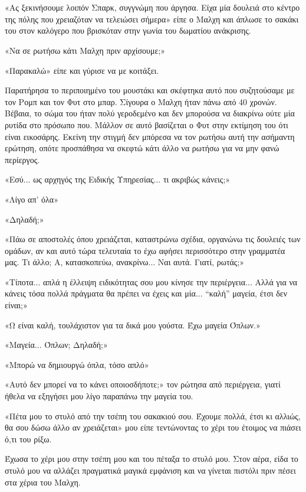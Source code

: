 \documentclass[12pt,twoside, openany]{book}
\begin{document}
\chapter{}

«Ας ξεκινήσουμε λοιπόν Σπαρκ, συγγνώμη που άργησα. Είχα μία δουλειά στο κέντρο της πόλης που χρειαζόταν να τελειώσει σήμερα» είπε ο Μαλχη και άπλωσε το σακάκι του στον καλόγερο που βρισκόταν στην γωνία του δωματίου ανάκρισης.

«Να σε ρωτήσω κάτι Μαλχη πριν αρχίσουμε;»

«Παρακαλώ» είπε και γύρισε να με κοιτάξει. 

Παρατήρησα το περιποιημένο του μουστάκι και σκέφτηκα αυτό που συζητούσαμε με τον Ρομπ και τον Φυτ στο μπαρ. Σίγουρα ο Μαλχη ήταν πάνω από 40 χρονών. Βέβαια, το σώμα του ήταν πολύ γεροδεμένο και δεν μπορούσα να διακρίνω ούτε μία ρυτίδα στο πρόσωπο που. Μάλλον σε αυτό βασίζεται ο Φυτ στην εκτίμηση του ότι είναι εικοσάρης. Εκείνη την στιγμή δεν μπόρεσα να τον ρωτήσω αυτή την ασήμαντη ερώτηση, οπότε προσπάθησα να σκεφτώ κάτι άλλο να ρωτήσω για να μην φανώ περίεργος.

«Εσύ... ως αρχηγός της Ειδικής Υπηρεσίας... τι ακριβώς κάνεις;»

«Λίγο απ’ όλα»

«Δηλαδή;»

«Πάω σε αποστολές όπου χρειάζεται, καταστρώνω σχέδια, οργανώνω τις δουλειές των ομάδων, αν και αυτό τώρα τελευταία το έχω αφήσει περισσότερο στην γραμματέα μας. Τι άλλο; Α, κατασκοπεύω, ανακρίνω... Ναι αυτά. Γιατί, ρωτάς;»

«Τίποτα... απλά η έλλειψη ειδικότητας σου μου κίνησε την περιέργεια... Αλλά για να κάνεις τόσα πολλά πράγματα θα πρέπει να έχεις και μία... “καλή” μαγεία, έτσι δεν είναι;»

«Ω είναι καλή, τουλάχιστον για τα δικά μου γούστα. Έχω μαγεία Όπλων.»

«Μαγεία... Όπλων; Δηλαδή;»

«Μπορώ να δημιουργώ όπλα, τόσο απλό»

«Αυτό δεν μπορεί να το κάνει οποιοσδήποτε;» τον ρώτησα από περιέργεια, γιατί ήθελα να εξηγήσει μου λίγο παραπάνω την μαγεία του.

«Πέτα μου το στυλό από την τσέπη του σακακιού σου. Έχουμε πολλά, έτσι κι αλλιώς, θα σου δώσω άλλο αν χρειάζεται» μου είπε τεντώνοντας το χέρι του έτοιμος να πιάσει ό,τι του ρίξω.

Έχωσα το χέρι μου στην τσέπη μου και του πέταξα το στυλό μου. Στον αέρα, είδα το στυλό μου να αλλάζει πραγματικά μαγικά εμφάνιση και να γίνεται πιστόλι πριν πέσει στα χέρια του Μαλχη.
\end{document}
